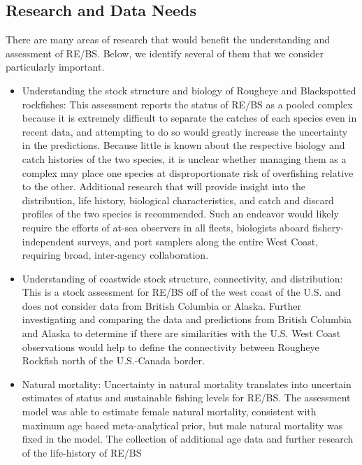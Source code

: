 \documentclass[
]{scrartcl}
\begin{document}
\subsection*{Research and Data Needs}\label{research-and-data-needs}

There are many areas of research that would benefit the understanding
and assessment of RE/BS. Below, we identify several of them that we
consider particularly important.

\begin{itemize}
\item
  Understanding the stock structure and biology of Rougheye and
  Blackspotted rockfishes: This assessment reports the status of RE/BS
  as a pooled complex because it is extremely difficult to separate the
  catches of each species even in recent data, and attempting to do so
  would greatly increase the uncertainty in the predictions. Because
  little is known about the respective biology and catch histories of
  the two species, it is unclear whether managing them as a complex may
  place one species at disproportionate risk of overfishing relative to
  the other. Additional research that will provide insight into the
  distribution, life history, biological characteristics, and catch and
  discard profiles of the two species is recommended. Such an endeavor
  would likely require the efforts of at-sea observers in all fleets,
  biologists aboard fishery-independent surveys, and port samplers along
  the entire West Coast, requiring broad, inter-agency collaboration.
\item
  Understanding of coastwide stock structure, connectivity, and
  distribution: This is a stock assessment for RE/BS off of the west
  coast of the U.S. and does not consider data from British Columbia or
  Alaska. Further investigating and comparing the data and predictions
  from British Columbia and Alaska to determine if there are
  similarities with the U.S. West Coast observations would help to
  define the connectivity between Rougheye Rockfish north of the
  U.S.-Canada border.
\item
  Natural mortality: Uncertainty in natural mortality translates into
  uncertain estimates of status and sustainable fishing levels for
  RE/BS. The assessment model was able to estimate female natural
  mortality, consistent with maximum age based meta-analytical prior,
  but male natural mortality was fixed in the model. The collection of
  additional age data and further research of the life-history of RE/BS

\end{itemize}
\end{document}

